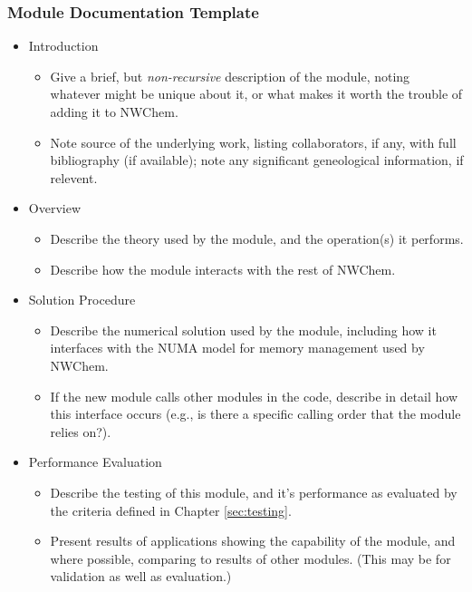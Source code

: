 \subsubsection{Module Documentation Template}

\begin{itemize}

\item Introduction

\begin{itemize}
\item Give a brief, but {\em non-recursive} description of the module, noting
whatever might be unique about it, or what makes it worth the trouble of
adding it to NWChem.
\item Note source of the underlying work, listing collaborators, if any, with full
bibliography (if available); note any significant geneological information, if relevent.
\end{itemize}

\item Overview

\begin{itemize}
\item Describe the theory used by the module, and the operation(s) it performs.
\item Describe how the module interacts with the rest of
NWChem.
\end{itemize}

\item Solution Procedure

\begin{itemize}
\item Describe the numerical solution used by the module, including how it interfaces
with the NUMA model for memory management used by NWChem.
\item If the new module calls other modules in the code, describe in detail how
this interface occurs (e.g., is there a specific calling order that the
module relies on?).
\end{itemize}

\item Performance Evaluation

\begin{itemize}
\item Describe the testing of this module, and it's performance as evaluated by
the criteria defined in Chapter \ref{sec:testing}.
\item Present results of applications showing the capability of the module, and
where possible, comparing to results of other modules.  (This may be for validation
as well as evaluation.)
\end{itemize}

\end{itemize}

